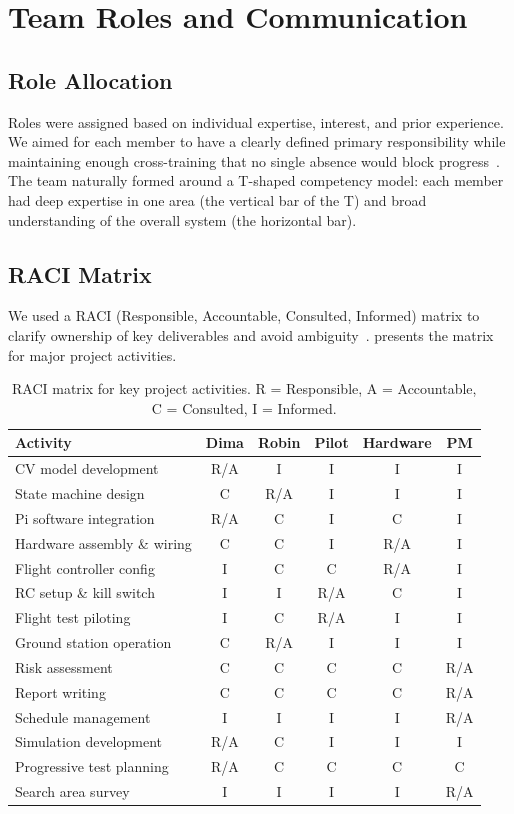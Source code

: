 \section{Team Roles and Communication}
\label{sec:team_roles}

\subsection{Role Allocation}

Roles were assigned based on individual expertise, interest, and prior experience. We aimed for each member to have a clearly defined primary responsibility while maintaining enough cross-training that no single absence would block progress~\cite{katzenbach2015wisdom}. The team naturally formed around a T-shaped competency model: each member had deep expertise in one area (the vertical bar of the T) and broad understanding of the overall system (the horizontal bar).

\subsection{RACI Matrix}

We used a RACI (Responsible, Accountable, Consulted, Informed) matrix to clarify ownership of key deliverables and avoid ambiguity~\cite{pmbok2021}.  presents the matrix for major project activities.

\begin{table}[htbp]
\centering
\compactTable
\caption{RACI matrix for key project activities. R = Responsible, A = Accountable, C = Consulted, I = Informed.}
\label{tab:raci}
\begin{tabular}{l c c c c c}
\toprule
\textbf{Activity} & \textbf{Dima} & \textbf{Robin} & \textbf{Pilot} & \textbf{Hardware} & \textbf{PM} \\
\midrule
CV model development & R/A & I & I & I & I \\
State machine design & C & R/A & I & I & I \\
Pi software integration & R/A & C & I & C & I \\
Hardware assembly \& wiring & C & C & I & R/A & I \\
Flight controller config & I & C & C & R/A & I \\
RC setup \& kill switch & I & I & R/A & C & I \\
Flight test piloting & I & C & R/A & I & I \\
Ground station operation & C & R/A & I & I & I \\
Risk assessment & C & C & C & C & R/A \\
Report writing & C & C & C & C & R/A \\
Schedule management & I & I & I & I & R/A \\
Simulation development & R/A & C & I & I & I \\
Progressive test planning & R/A & C & C & C & C \\
Search area survey & I & I & I & I & R/A \\
\bottomrule
\end{tabular}
\end{table}

